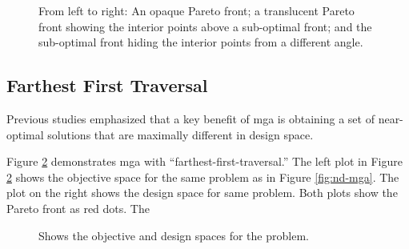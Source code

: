 \begin{figure}[H]
  \centering
  \resizebox{1\columnwidth}{!}{}
  \caption{From left to right: An opaque Pareto front; a translucent Pareto front showing the interior points above a sub-optimal front; and the sub-optimal front hiding the interior points from a different angle.}
  \label{fig:3d-mga}
\end{figure}

\subsection{Farthest First Traversal}
Previous studies emphasized that a key benefit of \ac{mga} is obtaining a set of near-optimal solutions that are maximally different
in design space.

Figure \ref{fig:mga-fft} demonstrates \ac{mga} with ``farthest-first-traversal.'' The left plot in Figure \ref{fig:mga-fft} shows the objective space for the same problem as in Figure \ref{fig:nd-mga}. The plot on the right shows the design
space for same problem. Both plots show the Pareto front as red dots. The 

\begin{figure}[H]
  \centering
  \resizebox{1\columnwidth}{!}{}
  \caption{Shows the objective and design spaces for the problem.}
  \label{fig:mga-fft}
\end{figure}
